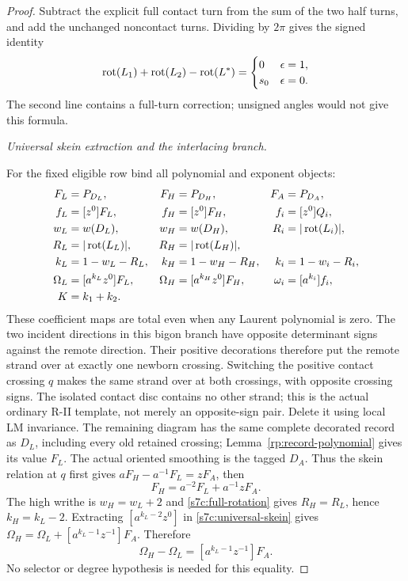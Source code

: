 \begin{proof}
Subtract the explicit full contact turn from the sum of the two half
turns, and add the unchanged noncontact turns.  Dividing by $2\pi$ gives
the signed identity
\begin{equation}\label{s7c:rotation-ledger}
 \operatorname{rot}(L_1)+\operatorname{rot}(L_2)-\operatorname{rot}(L^*)
 =\begin{cases}0&\epsilon=1,\\s_0&\epsilon=0.
 \end{cases}
\end{equation}
The second line contains a full-turn correction; unsigned angles would
not give this formula.

\par\medskip\noindent\emph{Universal skein extraction and the interlacing branch.}\par

For the fixed eligible row bind all polynomial and exponent objects:
\begin{align}
 F_L&=P_{D_L},&F_H&=P_{D_H},&F_A&=P_{D_A},\label{s7c:polynomial-binders}\\
 f_L&=[z^0]F_L,&f_H&=[z^0]F_H,&f_i&=[z^0]Q_i,\label{s7c:row-binders}\\
 w_L&=w(D_L),&w_H&=w(D_H),&R_i&=|\operatorname{rot}(L_i)|,\label{s7c:writhe-binders}\\
 R_L&=|\operatorname{rot}(L_L)|,&R_H&=|\operatorname{rot}(L_H)|,&&\label{s7c:rotation-binders}\\
 k_L&=1-w_L-R_L,&k_H&=1-w_H-R_H,&k_i&=1-w_i-R_i,\label{s7c:slot-binders}\\
 \Omega_L&=[a^{k_L}z^0]F_L,&\Omega_H&=[a^{k_H}z^0]F_H,
 &\omega_i&=[a^{k_i}]f_i,\label{s7c:coefficient-binders}\\
 K&=k_1+k_2.&&&&\label{s7c:product-slot}
\end{align}
These coefficient maps are total even when any Laurent polynomial is zero.
The two incident directions in this bigon branch have opposite
determinant signs against the remote direction. Their positive
decorations therefore put the remote strand over at exactly one
newborn crossing. Switching the positive contact crossing $q$ makes
the same strand over at both crossings, with opposite crossing signs.
The isolated contact disc contains no other strand; this is the actual
ordinary R-II template, not merely an opposite-sign pair. Delete it
using local LM invariance. The remaining diagram has the same complete
decorated record as $D_L$, including every old retained crossing;
Lemma~\ref{rp:record-polynomial} gives its value $F_L$. The actual
oriented smoothing is the tagged $D_A$. Thus the skein relation at $q$
first gives $aF_H-a^{-1}F_L=zF_A$, then
\begin{equation}\label{s7c:universal-skein}
 F_H=a^{-2}F_L+a^{-1}zF_A.
\end{equation}
The high writhe is $w_H=w_L+2$ and
\eqref{s7c:full-rotation} gives $R_H=R_L$, hence
$k_H=k_L-2$.  Extracting $[a^{k_L-2}z^0]$ in
\eqref{s7c:universal-skein} gives
$\Omega_H=\Omega_L+[a^{k_L-1}z^{-1}]F_A$.
Therefore
\begin{equation}\label{s7c:universal-extraction}
 \Omega_H-\Omega_L=[a^{k_L-1}z^{-1}]F_A.
\end{equation}
No selector or degree hypothesis is needed for this equality.


\end{proof}
